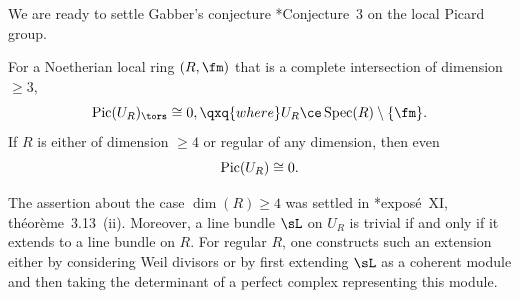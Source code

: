 

















 \label{passage-section}






We are ready to settle Gabber's conjecture \cite{Gab04}*{Conjecture~3} on the local Picard group.






\bthm%
\label{deg-2-case}
For a Noetherian local ring $(R, \fm)$ that is a complete intersection of dimension~$\ge 3$,
\[
\Pic(U_R)_\tors \cong 0, \qxq{where} U_R \ce \Spec(R) \setminus \{ \fm\}.
\]
If $R$ is either of dimension $\ge 4$ or regular of any dimension, then even
\[
\operatorname{Pic}(U_R) \cong 0.
\]
\ethm

\bpf
The assertion about the case $\dim(R) \ge 4$ was settled in \cite{SGA2new}*{expos\'{e}~XI, th\'{e}or\`{e}me~3.13~(ii)}. Moreover, a line bundle $\sL$ on $U_R$ is trivial if and only if it extends to a line bundle on $R$. For regular $R$, one constructs such an extension either by considering Weil divisors or by first extending $\sL$ as a coherent module and then taking the determinant of a perfect complex representing this module.

